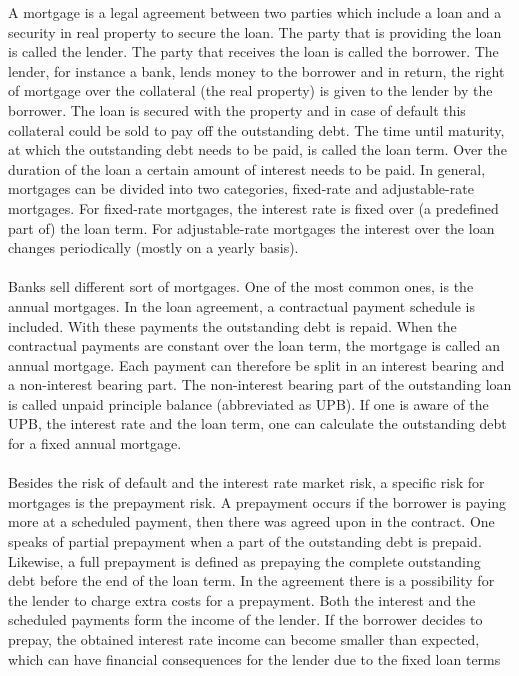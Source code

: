 A mortgage is a legal agreement between two parties which include a loan and 
a security in real property to secure the loan. The party that is providing 
the loan is called the lender. The party that receives the loan is called 
the borrower. 
The lender, for instance a bank, lends money to the borrower and in return,
the right of mortgage over the collateral (the real property) is given to 
the lender by the borrower.
The loan is secured with the property and in case of default 
this collateral could be sold to pay off the outstanding debt. The time 
until maturity, at which the outstanding debt needs to be paid, is 
called the loan term. 
Over the duration of the loan a certain amount of interest needs to be paid. In general, 
mortgages can be divided into two categories, fixed-rate and adjustable-rate
mortgages. For fixed-rate mortgages, the interest rate is fixed over 
(a predefined part of) the loan term. For adjustable-rate mortgages the 
interest over the loan changes periodically (mostly on a yearly basis).
\\\\
Banks sell different sort of mortgages. 
One of the most common ones, is the annual mortgages.  
In the loan agreement, a contractual payment schedule is included. 
With these payments the outstanding debt is repaid. When the contractual
payments are constant over the loan term, the mortgage is called 
an annual mortgage. Each payment can therefore be split in an 
interest bearing and a non-interest bearing part. The non-interest 
bearing part of the outstanding loan is called unpaid principle 
balance (abbreviated as UPB). If one is aware of the UPB, 
the interest rate and the loan term, one can calculate the 
outstanding debt for a fixed annual mortgage.  
\\\\
Besides the risk of default and the interest rate market risk, 
a specific risk for mortgages is the prepayment risk. A prepayment 
occurs if the borrower is paying more at a scheduled payment, then there 
was agreed upon in the contract. One speaks of partial 
prepayment when a part of the outstanding debt is prepaid. 
Likewise, a full prepayment is defined as prepaying the complete 
outstanding debt before the end of the loan term. In the agreement 
there is a possibility for the lender to charge extra costs for a prepayment. 
Both the interest and the scheduled payments 
form the income of the lender. If the borrower decides to prepay, 
the obtained interest rate income can become smaller than expected, which 
can have financial consequences for the lender due to the fixed loan terms
